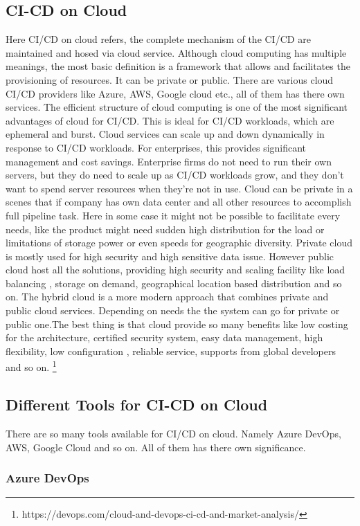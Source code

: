 %
\subsection{CI-CD on Cloud}
%
Here CI/CD on cloud refers, the complete mechanism of the CI/CD are maintained and hosed via cloud service. Although cloud computing has multiple meanings, the most basic definition is a framework that allows and facilitates the provisioning of resources. It can be private or public. There are various cloud CI/CD providers like Azure, AWS, Google cloud etc., all of them has there own services\cite{inproceedings}. The efficient structure of cloud computing is one of the most significant advantages of cloud for CI/CD. This is ideal for CI/CD workloads, which are ephemeral and burst. Cloud services can scale up and down dynamically in response to CI/CD workloads. For enterprises, this provides significant management and cost savings. Enterprise firms do not need to run their own servers, but they do need to scale up as CI/CD workloads grow, and they don't want to spend server resources when they're not in use. Cloud can be private in a scenes that if company has own data center and all other resources to accomplish full pipeline task. Here in some case it might not be possible to facilitate every needs, like the product might need sudden high distribution for the load or limitations of storage power or even speeds for geographic diversity. Private cloud is mostly used for high security and high sensitive data issue. However public cloud host all the solutions, providing high security and scaling facility like load balancing , storage on demand, geographical location based distribution and so on. The hybrid cloud is a more modern approach that combines private and public cloud services. Depending on needs the the system can go for private or public one.The best thing is that cloud provide so many benefits like low costing for the architecture, certified security system, easy data management, high flexibility, low configuration , reliable service, supports from global developers and so on.  \footnote{https://devops.com/cloud-and-devops-ci-cd-and-market-analysis/}
%
\subsection{Different Tools for CI-CD on Cloud}
%
There are so many tools available for CI/CD on cloud. Namely Azure DevOps, AWS, Google Cloud and so on. All of them has there own significance. 
%
\subsubsection{Azure DevOps}
%

